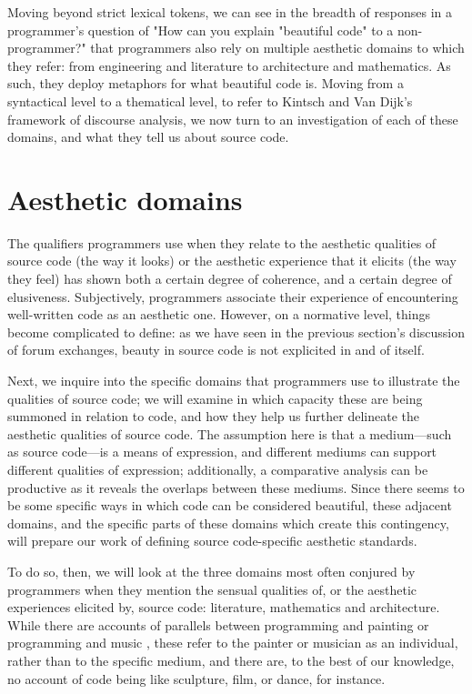 Moving beyond strict lexical tokens, we can see in the breadth of responses in a programmer's question of "How can you explain "beautiful code" to a non-programmer?" \citep{stackoverflow_how_2013} that programmers also rely on multiple aesthetic domains to which they refer: from engineering and literature to architecture and mathematics. As such, they deploy metaphors for what beautiful code is. Moving from a syntactical level to a thematical level, to refer to Kintsch and Van Dijk's framework of discourse analysis, we now turn to an investigation of each of these domains, and what they tell us about source code.

\section{Aesthetic domains}
\label{sec:aesthetic-domains}

The qualifiers programmers use when they relate to the aesthetic qualities of source code (the way it looks) or the aesthetic experience that it elicits (the way they feel) has shown both a certain degree of coherence, and a certain degree of elusiveness. Subjectively, programmers associate their experience of encountering well-written code as an aesthetic one. However, on a normative level, things become complicated to define: as we have seen in the previous section's discussion of forum exchanges, beauty in source code is not explicited in and of itself.

Next, we inquire into the specific domains that programmers use to illustrate the qualities of source code; we will examine in which capacity these are being summoned in relation to code, and how they help us further delineate the aesthetic qualities of source code. The assumption here is that a medium—such as source code—is a means of expression, and different mediums can support different qualities of expression; additionally, a comparative analysis can be productive as it reveals the overlaps between these mediums. Since there seems to be some specific ways in which code can be considered beautiful, these adjacent domains, and the specific parts of these domains which create this contingency, will prepare our work of defining source code-specific aesthetic standards.

To do so, then, we will look at the three domains most often conjured by programmers when they mention the sensual qualities of, or the aesthetic experiences elicited by, source code: literature, mathematics and architecture. While there are accounts of parallels between programming and painting \citep{graham_hackers_2003} or programming and music \citep{mclean_hacking_2004}, these refer to the painter or musician as an individual, rather than to the specific medium, and there are, to the best of our knowledge, no account of code being like sculpture, film, or dance, for instance.

